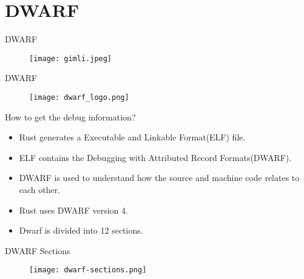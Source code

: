 \section{DWARF}
\begin{frame}{DWARF}
	\begin{figure}
		\texttt{[image: gimli.jpeg]}
	\end{figure}
\end{frame}


\begin{frame}{DWARF}
	\begin{figure}
		\texttt{[image: dwarf\_logo.png]}
	\end{figure}
\end{frame}

\begin{frame}{How to get the debug information?}
    \begin{itemize}
	    \item Rust generates a Executable and Linkable Format(ELF) file.
	    \item ELF contains the Debugging with Attributed Record Formats(DWARF).
	    \item DWARF is used to understand how the source and machine code relates to each other.
	    \item Rust uses DWARF version 4.
	    \item Dwarf is divided into 12 sections.
    \end{itemize}
\end{frame}


\begin{frame}{DWARF Sections}
	\begin{figure}
		\texttt{[image: dwarf-sections.png]}
	\end{figure}
\end{frame}

